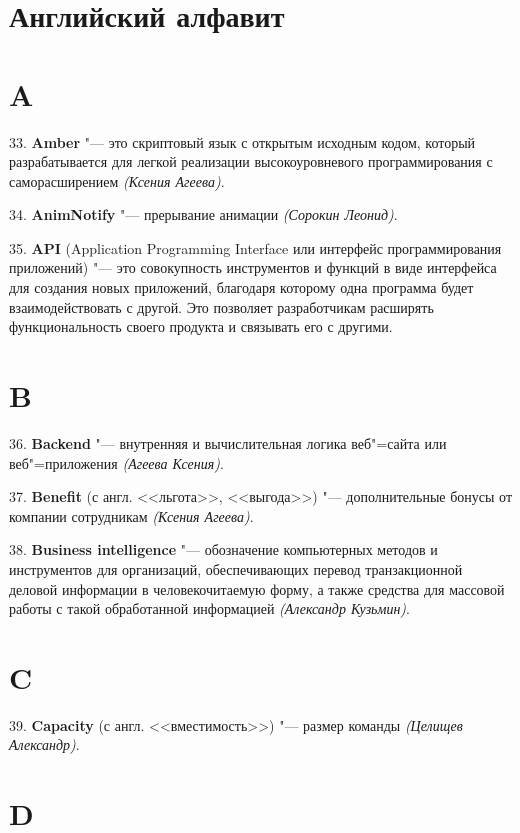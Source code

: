 \documentclass{article}
\begin{document}
\section*{Английский алфавит}
\section*{A}

\hspace{0.42cm} 33. \textbf{Amber} "--- это скриптовый язык с открытым исходным кодом, который
разрабатывается для легкой реализации высокоуровневого программирования с
саморасширением \textit{(Ксения Агеева)}.

34. \textbf{AnimNotify} "--- прерывание анимации \textit{(Сорокин Леонид)}.

35. \textbf{API} (Application Programming Interface или интерфейс
программирования приложений) "--- это совокупность инструментов и функций в виде
интерфейса для создания новых приложений, благодаря которому одна программа
будет взаимодействовать с другой. Это позволяет разработчикам расширять
функциональность своего продукта и связывать его с другими.

\section*{B}

\hspace{0.42cm} 36. \textbf{Backend} "--- внутренняя и вычислительная логика веб"=сайта или
веб"=приложения \textit{(Агеева Ксения)}.

37. \textbf{Benefit} (с англ. <<льгота>>, <<выгода>>) "--- дополнительные бонусы
от компании сотрудникам \textit{(Ксения Агеева)}.

38. \textbf{Business intelligence} "--- обозначение компьютерных методов и
инструментов для организаций, обеспечивающих перевод транзакционной деловой
информации в человекочитаемую форму, а также средства для массовой работы с
такой обработанной информацией \textit{(Александр Кузьмин)}.

\section*{C}

\hspace{0.33cm} 39. \textbf{Capacity} (с англ. <<вместимость>>) "--- размер
команды \textit{(Целищев Александр)}.

\section*{D}
\end{document}

